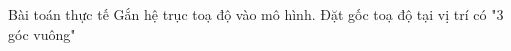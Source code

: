 \begin{dang}{Bài toán thực tế}
Gắn hệ trục toạ độ vào mô hình. Đặt gốc toạ độ tại vị trí có "3 góc vuông"
				 
				
						
				

\end{dang}
